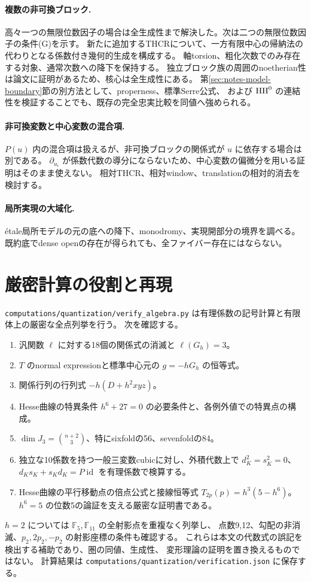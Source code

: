 \paragraph{複数の非可換ブロック.}
高々一つの無限位数因子の場合は全生成性まで解決した。次は二つの無限位数因子の条件(G)を示す。
新たに追加するTHCRについて、一方有限中心の帰納法の代わりとなる係数付き幾何的生成を構成する。
軸torsion、粗化次数でのみ存在する対象、通常次数への降下を保持する。
独立ブロック族の周囲のnoetherian性は論文に証明があるため、核心は全生成性にある。
第\ref{sec:notes-model-boundary}節の別方法として、properness、標準Serre公式、
および \(\operatorname{HH}^0\) の連結性を検証することでも、既存の完全忠実比較を同値へ強められる。

\paragraph{非可換変数と中心変数の混合項.}
\(P(u)\) 内の混合項は扱えるが、非可換ブロックの関係式が \(u\) に依存する場合は別である。
\(\partial_{u_i}\) が係数代数の導分にならないため、中心変数の偏微分を用いる証明はそのまま使えない。
相対THCR、相対window、translationの相対的消去を検討する。

\paragraph{局所実現の大域化.}
étale局所モデルの元の底への降下、monodromy、実現開部分の境界を調べる。
既約底でdense openの存在が得られても、全ファイバー存在にはならない。

\section{厳密計算の役割と再現}

\texttt{computations/quantization/verify\_algebra.py} は有理係数の記号計算と有限体上の厳密な全点列挙を行う。
次を確認する。
\begin{enumerate}
 \item 汎関数 \(\ell\) に対する18個の関係式の消滅と \(\ell(G_h)=3\)。
 \item \(T\) のnormal expressionと標準中心元の \(g=-hG_h\) の恒等式。
 \item 関係行列の行列式 \(-h(D+h^2xyz)\)。
 \item Hesse曲線の特異条件 \(h^6+27=0\) の必要条件と、各例外値での特異点の構成。
 \item \(\dim J_3=\binom{n+2}{3}\)、特にsixfoldの56、sevenfoldの84。
 \item 独立な10係数を持つ一般三変数cubicに対し、外積代数上で
 \(d_K^2=s_K^2=0\)、\(d_Ks_K+s_Kd_K=P\operatorname{id}\) を有理係数で検算する。
 \item Hesse曲線の平行移動点の倍点公式と接線恒等式
 \(T_{2p}(p)=h^3(5-h^6)\)。\(h^6=5\) の位数5の論証を支える厳密な証明書である。
\end{enumerate}
\(h=2\) については \(\mathbb F_5,\mathbb F_{11}\) の全射影点を重複なく列挙し、
点数9,12、勾配の非消滅、\(p_2,2p_2,-p_2\) の射影座標の条件も確認する。
これらは本文の代数式の誤記を検出する補助であり、圏の同値、生成性、
変形理論の証明を置き換えるものではない。
計算結果は \texttt{computations/quantization/verification.json} に保存する。

